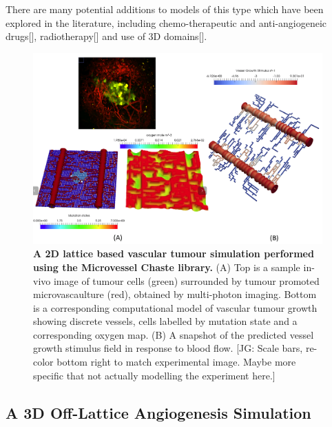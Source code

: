 \documentclass[10pt,letterpaper]{article}
\begin{document}
There are many potential additions to models of this type which have been explored in the literature, including chemo-therapeutic and anti-angiogeneic drugs[], radiotherapy[] and use of 3D domains[].

\begin{figure}[!h]
\centering
\includegraphics[width=0.99\textwidth]{Fig3.png}
\caption{{\bf A 2D lattice based vascular tumour simulation performed using the Microvessel Chaste library.}
(A) Top is a sample in-vivo image of tumour cells (green) surrounded by tumour promoted microvascaulture (red), obtained by multi-photon imaging. Bottom is a corresponding computational model of vascular tumour growth showing discrete vessels, cells labelled by mutation state and a corresponding oxygen map. (B) A snapshot of the predicted vessel growth stimulus field in response to blood flow. [JG: Scale bars, re-color bottom right to match experimental image. Maybe more specific that not actually modelling the experiment here.]}
\label{fig3}
\end{figure}

\subsection*{A 3D Off-Lattice Angiogenesis Simulation}
\end{document}
